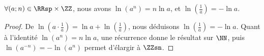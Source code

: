 

\begin{fact} \label{ln-id}
	$\forall (a;n) \in \RRsp \times \ZZ$,
	nous avons
	$\ln(a^n) = n \ln a$,
	et
	$\ln(\frac1a) = - \ln a$.
\end{fact}


\begin{proof}
	De $\ln(a \cdot \frac1a) = \ln a + \ln(\frac1a)$, nous déduisons $\ln(\frac1a) = - \ln a$.
	Quant à l'identité $\ln(a^n) = n \ln a$, une récurrence donne le résultat sur $\NN$, puis $\ln(a^{-n}) = -\ln(a^n)$ permet d'élargir à $\ZZsn$.
\end{proof}